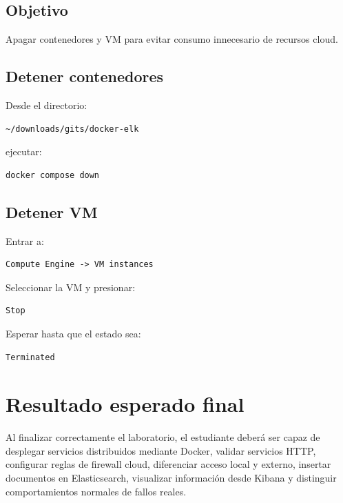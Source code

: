 \documentclass[
  coursetitle={Cómputo Nube y Tecnologías Emergentes},
  coursehours={96},
  coursedate={Verano 2026},
  doctype={Laboratorio},
  otherlangs={english,french},
  authorname={Lázaro},
  authorsurname={Bustio-Martínez},
  authortitle={PhD},
  role={Profesor Investigador},
  email={lbustio@inaoe.mx},
  phone={5559504000},
  ext={7459},
  institution={Instituto Nacional de Astrofísica, Óptica y Electrónica (INAOE)},
  department={Maestría en Ciencias en Tecnologías de Seguridad},
  address={Luis Enrique Erro 1, Sta. Ma. Tonantzintla, San Andrés Cholula, CP 72840, Puebla, México},
  margin={0.5in}
]{../../lbustio_lecture_notes}
\begin{document}
\subsection{Objetivo}

Apagar contenedores y VM para evitar consumo innecesario de recursos cloud.

\subsection{Detener contenedores}

Desde el directorio:

\begin{verbatim}
~/downloads/gits/docker-elk
\end{verbatim}

ejecutar:

\begin{lstlisting}
docker compose down
\end{lstlisting}

\subsection{Detener VM}

Entrar a:

\begin{verbatim}
Compute Engine -> VM instances
\end{verbatim}

Seleccionar la VM y presionar:

\begin{verbatim}
Stop
\end{verbatim}

Esperar hasta que el estado sea:

\begin{verbatim}
Terminated
\end{verbatim}

\section{Resultado esperado final}

Al finalizar correctamente el laboratorio, el estudiante deberá ser capaz de desplegar servicios distribuidos mediante Docker, validar servicios HTTP, configurar reglas de firewall cloud, diferenciar acceso local y externo, insertar documentos en Elasticsearch, visualizar información desde Kibana y distinguir comportamientos normales de fallos reales.
\end{document}
